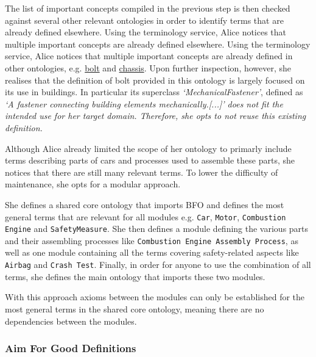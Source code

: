 \begin{example}
The list of important concepts compiled in the previous step is then checked against several other relevant ontologies in order to identify terms that are already defined elsewhere. Using the terminology service, Alice notices that multiple important concepts are already defined elsewhere. Using the terminology service, Alice notices that multiple important concepts are already defined in other ontologies, e.g. \href{https://pi.pauwel.be/voc/buildingelement#MechanicalFastener-BOLT}{bolt} and \href{http://purl.obolibrary.org/obo/NCIT_C49869}{chassis}. Upon further inspection, however, she realises that the definition of bolt provided in this ontology is largely focused on its use in buildings. In particular its superclass \textit{`MechanicalFastener'}, defined as \textit{`A fastener connecting building elements mechanically.[...]' does not fit the intended use for her target domain. Therefore, she opts to not reuse this existing definition.} 
\end{example}

\begin{example}
    Although Alice already limited the scope of her ontology to primarly include terms describing parts of cars and processes used to assemble these parts, she notices that there are still many relevant terms. To lower the difficulty of maintenance, she opts for a modular approach. 

    She defines a shared core ontology that imports BFO and defines the most general terms that are relevant for all modules e.g. \texttt{Car}, \texttt{Motor}, \texttt{Combustion Engine} and \texttt{SafetyMeasure}. She then defines a module defining the various parts and their assembling processes like \texttt{Combustion Engine Assembly Process}, as well as one module containing all the terms covering safety-related aspects like \texttt{Airbag} and \texttt{Crash Test}. Finally, in order for anyone to use the combination of all terms, she defines the main ontology that imports these two modules.

    With this approach axioms between the modules can only be established for the most general terms in the shared core ontology, meaning there are no dependencies between the modules.
\end{example}

\subsubsection{Aim For Good Definitions}

